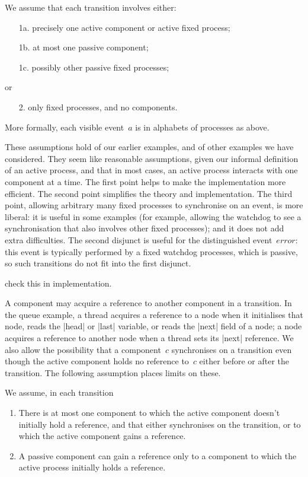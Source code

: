 \begin{assumption}
We assume that each transition involves either:
%
\begin{enumerate}
\item[1a.] precisely one active component or active fixed process;
\item[1b.] at most one passive component;
\item[1c.] possibly other passive fixed processes;
\end{enumerate}
%
or
\begin{enumerate}
\item[2.] only fixed processes, and no components.
\end{enumerate}
%
More formally, each visible event~$a$ is in alphabets of processes as above. 
\end{assumption}
%
These assumptions hold of our earlier examples, and of other examples we have
considered.  They seem like reasonable assumptions, given our informal
definition of an active process, and that in most cases, an active process
interacts with one component at a time.  The first point helps to make the
implementation more efficient.  The second point simplifies the theory and
implementation.  The third point, allowing arbitrary many fixed processes to
synchronise on an event, is more liberal: it is useful in some examples (for
example, allowing the watchdog to see a synchronisation that also involves
other fixed processes); and it does not add extra difficulties.  The second
disjunct is useful for the distinguished event~$error$: this event is
typically performed by a fixed watchdog processes, which is passive, so such
transitions do not fit into the first disjunct.


\begin{improve}
check this in implementation.
\end{improve}

A component may acquire a reference to another component in a transition.  In
the queue example, a thread acquires a reference to a node when it initialises
that node, reads the |head| or |last| variable, or reads the |next| field of a
node; a node acquires a reference to another node when a thread sets its
|next| reference.  We also allow the possibility that a component~$c$
synchronises on a transition even though the active component holds no
reference to~$c$ either before or after the transition.  The following
assumption places limits on these. 
%
\begin{assumption}
\label{assump:2}
We assume, in each transition
\begin{enumerate}
\item\label{assump:max-one-extra-component} There is at most one component to
  which the active component doesn't initially hold a reference, and that
  either synchronises on the transition, or to which the active component
  gains a reference.

\item\label{assump:secondary-cpts-new-refs} A passive component can gain a
  reference only to a component to which the active process initially holds a
  reference.
\end{enumerate}
\end{assumption}

